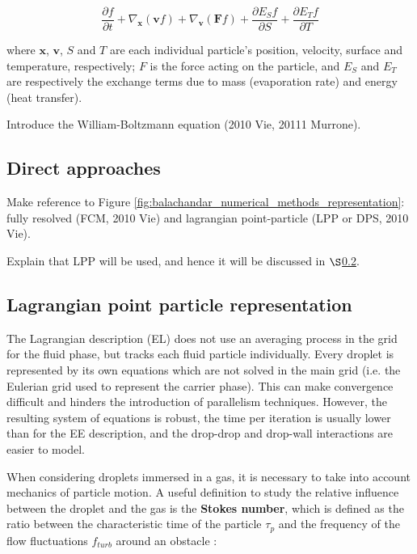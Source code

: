 \begin{equation}
\frac{\partial f}{\partial t} + \nabla_\textbf{x} \left( \textbf{v} f \right) + \nabla_\textbf{v} \left( \textbf{F} f \right) + \frac{\partial E_S f}{\partial S} + \frac{\partial E_T f}{\partial T}
\end{equation}

where $\textbf{x}$, $\textbf{v}$, $S$ and $T$ are each individual particle's position, velocity, surface and temperature, respectively; $F$ is the force acting on the particle, and $E_S$ and $E_T$ are respectively the exchange terms due to mass (evaporation rate) and energy (heat transfer).

Introduce the William-Boltzmann equation (2010 Vie, 20111 Murrone). 

\subsection{Direct approaches}

Make reference to Figure \ref{fig:balachandar_numerical_methods_representation}: fully resolved (FCM, 2010 Vie) and lagrangian point-particle (LPP or DPS, 2010 Vie). 

Explain that LPP will be used, and hence it will be discussed in $\S$\ref{sec:ch3_EL_formalisms}.




\subsection{Lagrangian point particle representation}
\label{sec:ch3_EL_formalisms}


The Lagrangian description (EL) does not use an averaging process in the grid for the fluid phase, but tracks each fluid particle individually. Every droplet is represented by its own equations which are not solved in the main grid (i.e. the Eulerian grid used to represent the carrier phase). This can make convergence difficult and hinders the introduction of parallelism techniques. However, the resulting system of equations is robust, the time per iteration is usually lower than for the EE description, and the drop-drop and drop-wall interactions are easier to model.

When considering droplets immersed in a gas, it is necessary to take into account mechanics of particle motion. A useful definition to study the relative influence between the droplet and the gas is the \textbf{Stokes number}, which is defined as the ratio between the characteristic time of the particle $\tau_p$ and the frequency of the flow fluctuations $f_{turb}$ around an obstacle :

